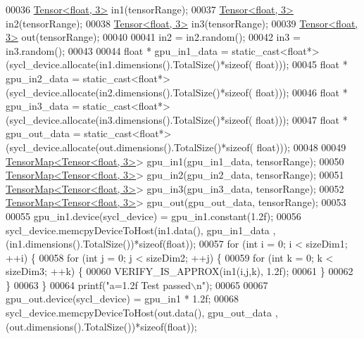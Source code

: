 \begin{DoxyCode}
00036   \hyperlink{class_eigen_1_1_tensor}{Tensor<float, 3>} in1(tensorRange);
00037   \hyperlink{class_eigen_1_1_tensor}{Tensor<float, 3>} in2(tensorRange);
00038   \hyperlink{class_eigen_1_1_tensor}{Tensor<float, 3>} in3(tensorRange);
00039   \hyperlink{class_eigen_1_1_tensor}{Tensor<float, 3>} out(tensorRange);
00040 
00041   in2 = in2.random();
00042   in3 = in3.random();
00043 
00044   \textcolor{keywordtype}{float} * gpu\_in1\_data  = \textcolor{keyword}{static\_cast<}\textcolor{keywordtype}{float}*\textcolor{keyword}{>}(sycl\_device.allocate(in1.dimensions().TotalSize()*\textcolor{keyword}{sizeof}(
      float)));
00045   \textcolor{keywordtype}{float} * gpu\_in2\_data  = \textcolor{keyword}{static\_cast<}\textcolor{keywordtype}{float}*\textcolor{keyword}{>}(sycl\_device.allocate(in2.dimensions().TotalSize()*\textcolor{keyword}{sizeof}(
      float)));
00046   \textcolor{keywordtype}{float} * gpu\_in3\_data  = \textcolor{keyword}{static\_cast<}\textcolor{keywordtype}{float}*\textcolor{keyword}{>}(sycl\_device.allocate(in3.dimensions().TotalSize()*\textcolor{keyword}{sizeof}(
      float)));
00047   \textcolor{keywordtype}{float} * gpu\_out\_data =  \textcolor{keyword}{static\_cast<}\textcolor{keywordtype}{float}*\textcolor{keyword}{>}(sycl\_device.allocate(out.dimensions().TotalSize()*\textcolor{keyword}{sizeof}(
      float)));
00048 
00049   \hyperlink{class_eigen_1_1_tensor_map}{TensorMap<Tensor<float, 3>}> gpu\_in1(gpu\_in1\_data, tensorRange);
00050   \hyperlink{class_eigen_1_1_tensor_map}{TensorMap<Tensor<float, 3>}> gpu\_in2(gpu\_in2\_data, tensorRange);
00051   \hyperlink{class_eigen_1_1_tensor_map}{TensorMap<Tensor<float, 3>}> gpu\_in3(gpu\_in3\_data, tensorRange);
00052   \hyperlink{class_eigen_1_1_tensor_map}{TensorMap<Tensor<float, 3>}> gpu\_out(gpu\_out\_data, tensorRange);
00053 
00055   gpu\_in1.device(sycl\_device) = gpu\_in1.constant(1.2f);
00056   sycl\_device.memcpyDeviceToHost(in1.data(), gpu\_in1\_data ,(in1.dimensions().TotalSize())*\textcolor{keyword}{sizeof}(\textcolor{keywordtype}{float}));
00057   \textcolor{keywordflow}{for} (\textcolor{keywordtype}{int} i = 0; i < sizeDim1; ++i) \{
00058     \textcolor{keywordflow}{for} (\textcolor{keywordtype}{int} j = 0; j < sizeDim2; ++j) \{
00059       \textcolor{keywordflow}{for} (\textcolor{keywordtype}{int} k = 0; k < sizeDim3; ++k) \{
00060         VERIFY\_IS\_APPROX(in1(i,j,k), 1.2f);
00061       \}
00062     \}
00063   \}
00064   printf(\textcolor{stringliteral}{"a=1.2f Test passed\(\backslash\)n"});
00065 
00067   gpu\_out.device(sycl\_device) = gpu\_in1 * 1.2f;
00068   sycl\_device.memcpyDeviceToHost(out.data(), gpu\_out\_data ,(out.dimensions().TotalSize())*\textcolor{keyword}{sizeof}(\textcolor{keywordtype}{float}));

\end{DoxyCode}
